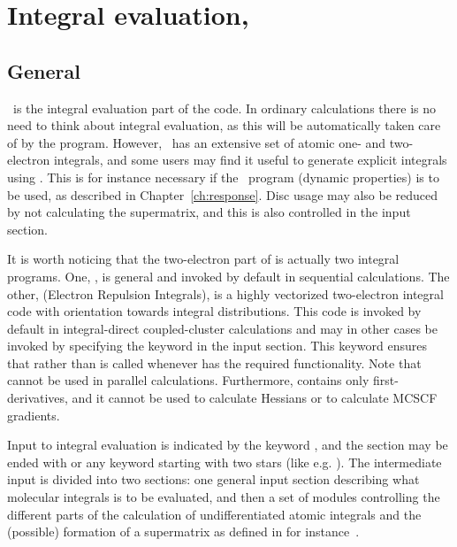 \chapter{Integral evaluation, {\her}}\label{ch:hermit}

\section{General}\label{sec:herminf}

    \her\ is the integral evaluation part of the code. In ordinary
calculations there is no need to think about integral evaluation, as
this will be automatically taken care of by the program. However,
\her\ has an extensive set of atomic one- and two-electron
integrals,
and some users may find it useful to generate explicit integrals using
\her . This is for instance necessary if the \resp\ program (dynamic
properties) is to be
used, as described in Chapter~\ref{ch:response}. Disc usage may also
be reduced by not calculating the
supermatrix, and this is also controlled in the
 input section.

It is worth noticing that the two-electron part of {\her} is actually
two integral programs. One, {\twoint}, is general and invoked by
default in sequential calculations. The other, {\eri} (Electron Repulsion
Integrals), is a highly vectorized two-electron integral code with
orientation towards integral distributions. This code is
invoked by default in integral-direct coupled-cluster calculations and
may in other cases be invoked by specifying the  keyword
in the  input section. This keyword ensures that {\eri}
rather than {\her} is called whenever {\eri} has the required
functionality. Note that {\eri} cannot be used in
parallel calculations. Furthermore, {\eri} contains only
first-derivatives, and it cannot be used to calculate Hessians
or to calculate MCSCF gradients.

    Input to integral evaluation is
indicated by the keyword , and the section may be
ended with  or any keyword starting with two stars
(like e.g. ). The intermediate input is
divided into two sections: one general input section describing
what molecular integrals is to be evaluated, and then a set of
modules controlling the different parts of the calculation of
undifferentiated atomic integrals and the (possible) formation of
a supermatrix as defined in for instance~\cite{pemsjaahborjcp74}.


